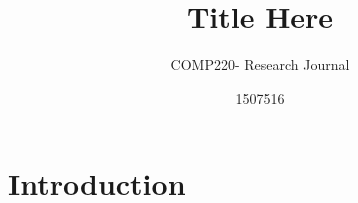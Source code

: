 \documentclass{scrartcl}
\title{Title Here}
\subtitle{COMP220- Research Journal}
\author{1507516}
\begin{document}
\maketitle

\abstract{}

\section{Introduction}







\end{document}
